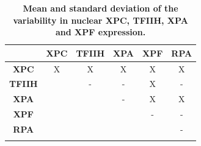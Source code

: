 \begin{table}[h!]
	\centering
	\begin{tabular}{cccccc}
		\hline
			\rule{0pt}{2ex}
			&\textbf{XPC} & \textbf{TFIIH} & \textbf{XPA} & \textbf{XPF} & \textbf{RPA}\\ \hline
			\rule{0pt}{3ex}
\textbf{XPC}&        X    &           X    & X            &         X    & X            \\ \hline
			\rule{0pt}{3ex}
\textbf{TFIIH}&           & -              & -            & X            & -             \\ \hline
			\rule{0pt}{3ex}
\textbf{XPA}&             &                & -            & X            & X             \\ \hline
			\rule{0pt}{3ex}
\textbf{XPF}&             &                &              & -            & -              \\ \hline
			\rule{0pt}{3ex}
\textbf{RPA}&             &                &              &              & -               \\ \hline
			\rule{0pt}{3ex}
		
	\end{tabular}
	\caption{\textbf{Mean and standard deviation of the variability in nuclear XPC, TFIIH, XPA and XPF expression.} }\label{tab:co-staining}
\end{table}   

